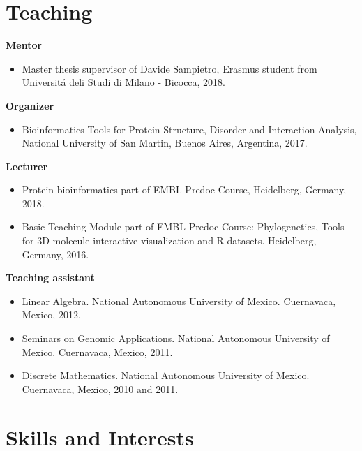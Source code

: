 \documentclass[11pt,a4paper,sans]{moderncv} %
\begin{document}
\section{Teaching}
\vspace{-.1cm}
\textbf{Mentor}
\begin{itemize}
  \item Master thesis supervisor of Davide Sampietro, Erasmus student from Universit\'a deli Studi di Milano - Bicocca, 2018.
\end{itemize}
\vspace{.1cm}
\textbf{Organizer}
\begin{itemize}
  \item Bioinformatics Tools for Protein Structure, Disorder and Interaction Analysis, National University of San Martin, Buenos Aires, Argentina, 2017.
\end{itemize}
\vspace{.1cm}
\textbf{Lecturer}
\begin{itemize}
  \item Protein bioinformatics part of EMBL Predoc Course, Heidelberg, Germany, 2018.
  \item Basic Teaching Module part of EMBL Predoc Course: Phylogenetics, Tools for 3D molecule interactive visualization and R datasets. Heidelberg, Germany, 2016.
\end{itemize}
\vspace{.1cm}
\textbf{Teaching assistant}
\begin{itemize}
  \item Linear Algebra. National Autonomous University of Mexico. Cuernavaca, Mexico, 2012.
  \item Seminars on Genomic Applications. National Autonomous University of Mexico. Cuernavaca, Mexico, 2011.
  \item Discrete Mathematics. National Autonomous University of Mexico. Cuernavaca, Mexico, 2010 and 2011.
\end{itemize}

\section{Skills and Interests}
\end{document}
